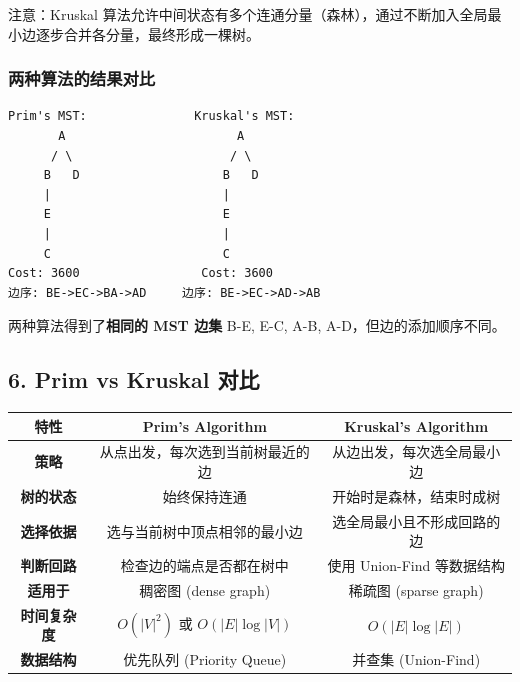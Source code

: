 \documentclass[10pt,a4paper,openany]{ctexbook}
\theoremstyle{definition}
\theoremstyle{remark}
\renewenvironment{quote}
  {\list{}{\leftmargin=1em\rightmargin=0pt\topsep=0.5pt\partopsep=0pt}\item[]}
  {\endlist}
\begin{document}
\begin{quote}
注意：Kruskal 算法允许中间状态有多个连通分量（森林），通过不断加入全局最小边逐步合并各分量，最终形成一棵树。

\end{quote}
\vspace{-2pt}

\subsubsection{两种算法的结果对比}

{\footnotesize\begin{verbatim}
Prim's MST:               Kruskal's MST:
       A                        A
      / \                      / \
     B   D                    B   D
     |                        |
     E                        E
     |                        |
     C                        C
Cost: 3600                 Cost: 3600
边序: BE->EC->BA->AD     边序: BE->EC->AD->AB
\end{verbatim}}

两种算法得到了\textbf{相同的 MST 边集} {B-E, E-C, A-B, A-D}，但边的添加顺序不同。
\vspace{-2pt}

\subsection{6. Prim vs Kruskal 对比}

\begin{center}
\begin{tabular}{ccc}
\hline
特性 & Prim's Algorithm & Kruskal's Algorithm \\ \hline
\textbf{策略} & 从点出发，每次选到当前树最近的边 & 从边出发，每次选全局最小边 \\
\textbf{树的状态} & 始终保持连通 & 开始时是森林，结束时成树 \\
\textbf{选择依据} & 选与当前树中顶点相邻的最小边 & 选全局最小且不形成回路的边 \\
\textbf{判断回路} & 检查边的端点是否都在树中 & 使用 Union-Find 等数据结构 \\
\textbf{适用于} & 稠密图 (dense graph) & 稀疏图 (sparse graph) \\
\textbf{时间复杂度} & $O(|V|^2)$ 或 $O(|E|\log|V|)$ & $O(|E|\log|E|)$ \\
\textbf{数据结构} & 优先队列 (Priority Queue) & 并查集 (Union-Find) \\
\hline
\end{tabular}

\end{center}
\end{document}
